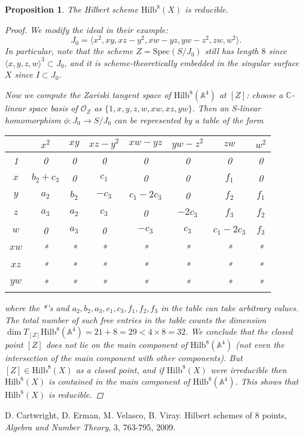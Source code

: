 \documentclass{amsart}[12pt]
\newtheorem{prop}[theorem]{Proposition}
\theoremstyle{definition}
\theoremstyle{remark}
\numberwithin{equation}{section}
\begin{document}
\begin{prop}
The Hilbert scheme $\mathrm{Hilb}^8(X)$ is reducible.
\begin{proof}
We modify the ideal in their example:
\[
J_0 = \langle x^2, xy, xz - y^2, xw - yz, yw - z^2, zw, w^2 \rangle.
\]
In particular, note that the scheme $Z = \mathrm{Spec}(S/J_0)$ still has length $8$ since $\langle x, y, z, w \rangle^3 \subset J_0$, and it is scheme-theoretically embedded in the singular surface $X$ since $I \subset J_0$.

Now we compute the Zariski tangent space of $\mathrm{Hilb}^8(\mathbb{A}^4)$ at $[Z]$: choose a $\mathbb{C}$-linear space basis of $\mathcal{O}_Z$ as $\{1, x, y, z, w, xw, xz, yw\}$. Then an $S$-linear homomorphism $\phi: J_0 \to S/J_0$ can be represented by a table of the form
\begin{center}
      \begin{tabular}[b]{ c | c c c c c c c}
    & $x^2$ & $xy$ & $xz - y^2$ & $xw - yz$ & $yw - z^2$ & $zw$ & $w^2$ \\ \hline
    1 &  0 & 0 & 0 & 0 & 0 & 0 & 0  \\
    $x$ & $b_2 + c_3$ & 0 & $c_1$ & 0 & 0 & $f_1$ & 0 \\
    $y$ & $a_2$ & $b_2$ & $-c_3$ & $c_1 - 2c_3$ & 0 & $f_2$ & $f_1$ \\ 
    $z$ & $a_3$ & $a_2$ & $c_3$ & 0 & $-2c_3$ & $f_3$ & $f_2$ \\
    $w$ & 0 & $a_3$ & 0 & $-c_3$ & $c_3$ & $c_1 - 2c_3$ & $f_3$ \\
    $xw$ & * & * & * & * & * & * & * \\
    $xz$  & * & * & * & * & * & * & * \\
    $yw$  & * & * & * & * & * & * & * \\
  \end{tabular}
\end{center}
where the *'s and $a_2, b_2, a_3, c_1, c_3, f_1, f_2, f_3$ in the table can take arbitrary values. The total number of such free entries in the table counts the dimension $\dim T_{[Z]}\mathrm{Hilb}^8(\mathbb{A}^4) = 21 + 8 = 29 < 4 \times 8 = 32$. We conclude that the closed point $[Z]$ does not lie on the main component of $\mathrm{Hilb}^8(\mathbb{A}^4)$ (not even the intersection of the main component with other components). But $[Z] \in \mathrm{Hilb}^8(X)$ as a closed point, and if $\mathrm{Hilb}^8(X)$ were irreducible then $\mathrm{Hilb}^8(X)$ is contained in the main component of $\mathrm{Hilb}^8(\mathbb{A}^4)$. This shows that $\mathrm{Hilb}^8(X)$ is reducible.
\end{proof}
\end{prop}

\begin{thebibliography}{CEVV}
\raggedright

D. Cartwright, D. Erman, M. Velasco, B. Viray. Hilbert schemes of 8 points, \textit{Algebra and Number Theory}, 3, 763-795, 2009.


\end{thebibliography}
\end{document}
